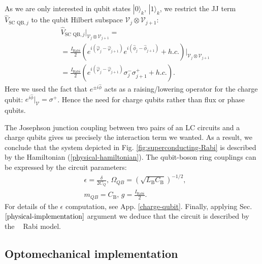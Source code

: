 \documentclass[reprint, aps, prx, amsmath, amssymb, longbibliography, superscriptaddress]{revtex4-2}
\DeclareMathOperator{\Zthree}{\mathbb{Z}_3}
\begin{document}
As we are only interested in qubit states $|0\rangle_k,\, |1\rangle_k$, we restrict the JJ term $\hat V_{\text{SC QB},j}$ to the qubit Hilbert subspace $\mathcal{V}_j\otimes \mathcal{V}_{j+1}$:
\begin{equation}
\begin{aligned}
    &\hat V_{\text{SC QB},j} \bigg |_{\mathcal{V}_j\otimes \mathcal{V}_{j+1}} = \\
    &=\frac{I_{\text{Rabi}}}{2}\left(e^{i(\hat\varphi_j - \hat\varphi_{j+1})} e^{i(\hat\phi_j - \hat\phi_{j+1})} + h.c. \right) \bigg|_{\mathcal{V}_j\otimes \mathcal{V}_{j+1}} \\
    &=\frac{I_{\text{Rabi}}}{2}\left(e^{i(\hat\varphi_j - \hat\varphi_{j+1})} \sigma_j^- \sigma_{j+1}^+ + h.c. \right).
\end{aligned}
\end{equation}
Here we used the fact that $e^{\pm i\hat\phi}$ acts as a raising/lowering operator for the charge qubit: $e^{i\hat\phi}|_{\mathcal{V}} = \sigma^+$. Hence the need for charge qubits rather than flux or phase qubits.

The Josephson junction coupling between two pairs of an LC circuits and a charge qubits gives us precisely the interaction term we wanted. As a result, we conclude that the system depicted in Fig. \ref{fig:superconducting-Rabi} is described by the Hamiltonian (\ref{physical-hamiltonian}).  The qubit-boson ring couplings can be expressed by the circuit parameters:
\begin{equation}
\begin{aligned}
    &\epsilon = \frac{\delta}{2 C_Q},\,
    \Omega_{QB} = \left(\sqrt{L_{\text{B}}C_{\text{B}}}\right)^{-1/2}, \\
    &m_{QB} = C_{\text{B}}, \, g = \frac{I_{\text{Rabi}}}{2}.
\end{aligned}
\end{equation}
For details of the $\epsilon$ computation, see App. \ref{charge-qubit}. Finally, applying Sec. $\ref{physical-implementation}$ argument we deduce that the circuit is described by the $\Zthree$ Rabi model.


\subsection{Optomechanical implementation}
\label{optomechanical-implementation}
\end{document}
